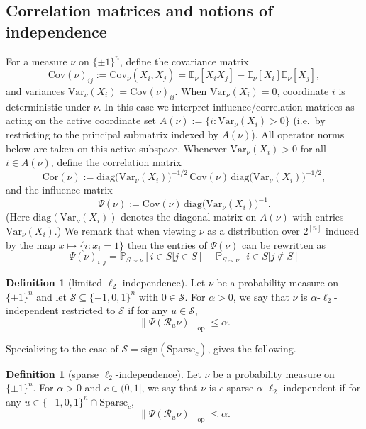 \documentclass[11pt,reqno,letterpaper]{amsart}
\renewcommand{\P}{\mathbb{P}}
\newcommand{\set}[1]{\{#1 \}}
\numberwithin{equation}{section}
\theoremstyle{definition}
\newtheorem{definition}[theorem]{Definition}
\newcommand{\mc}{\mathcal}
\begin{document}
\subsection{Correlation matrices and notions of independence}

For a measure $\nu$ on $\{\pm 1\}^n$, define the covariance matrix
\[
\mathrm{Cov}(\nu)_{ij}
:= \mathrm{Cov}_\nu(X_i,X_j)
= \mathbb{E}_\nu[X_iX_j]-\mathbb{E}_\nu[X_i]\mathbb{E}_\nu[X_j],
\]
and variances $\mathrm{Var}_\nu(X_i)=\mathrm{Cov}(\nu)_{ii}$. When $\mathrm{Var}_\nu(X_i)=0$, coordinate $i$ is deterministic under $\nu$.
In this case we interpret influence/correlation matrices as acting on the {active} coordinate set
$A(\nu):=\{i:\mathrm{Var}_\nu(X_i)>0\}$ (i.e.\ by restricting to the principal submatrix indexed by $A(\nu)$).
All operator norms below are taken on this active subspace.
Whenever $\mathrm{Var}_\nu(X_i)>0$ for all $i\in A(\nu)$, define the correlation matrix
\[
\mathrm{Cor}(\nu)
:=
\mathrm{diag}\!\bigl(\mathrm{Var}_\nu(X_i)\bigr)^{-1/2}
\,\mathrm{Cov}(\nu)\,
\mathrm{diag}\!\bigl(\mathrm{Var}_\nu(X_i)\bigr)^{-1/2},
\]
and the influence matrix
\[
\Psi(\nu)
:=
\mathrm{Cov}(\nu)\,
\mathrm{diag}\!\bigl(\mathrm{Var}_\nu(X_i)\bigr)^{-1}.
\]
(Here $\mathrm{diag}(\mathrm{Var}_\nu(X_i))$ denotes the diagonal matrix on $A(\nu)$ with entries
$\mathrm{Var}_\nu(X_i)$.)
We remark that when viewing $\nu$ as a distribution over $ 2^{[n]}$ induced by the map $ x\mapsto \set{i: x_i =1}$ then the entries of $ \Psi(\nu)$ can be rewritten as 
\[ \Psi(\nu)_{i,j} = \P_{S\sim \nu} [i \in S |j\in S] - \P_{S\sim \nu} [i \in S |j\not\in S]\]

\begin{definition}[limited $\ell_2$-independence]
\label{def:limited-ell_2-independence}
Let $\nu$ be a probability measure on $\{\pm 1\}^n$ and let $\mc{S} \subseteq \{-1,0,1\}^n$ with $0 \in \mc{S}$. For $\alpha > 0$, we say that $\nu$ is $\alpha$-$
\ell_2$-independent restricted to $\mc{S}$ if for any $u \in \mc{S}$,    
\[
\|\Psi(\mathcal{R}_u \nu)\|_{\mathrm{op}} \le \alpha.
\]
\end{definition}

Specializing to the case of $\mc{S} = \mathrm{sign}(\mathrm{Sparse}_c)$, gives the following. 

\begin{definition}[sparse $\ell_2$-independence]
Let $\nu$ be a probability measure on $\{\pm 1\}^n$. For $\alpha > 0$ and $c \in (0,1]$, we say that $\nu$ is $c$-sparse $\alpha$-$\ell_2$-independent if for any $u \in \{-1,0,1\}^n \cap \mathrm{Sparse}_c$,
\[
\|\Psi(\mathcal{R}_u \nu)\|_{\mathrm{op}} \le \alpha.
\]
\end{definition}
\end{document}
